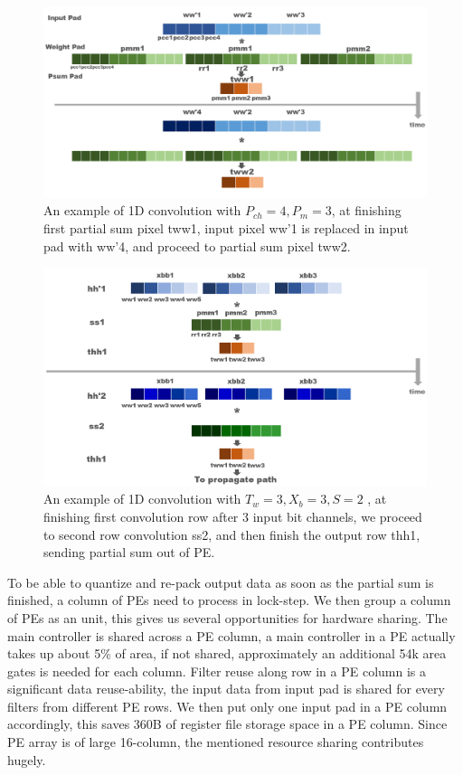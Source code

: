 \begin{figure}
    \centering
    \includegraphics[width=1\linewidth]{inc/4_proposed_architecture/figure/tww.png}
    \caption{An example of 1D convolution with $P_{ch}=4,P_m=3$, at finishing first partial sum pixel tww1, input pixel ww'1 is replaced in input pad with ww'4, and proceed to partial sum pixel tww2. }
    \label{fig:tww}
\end{figure}
\begin{figure}
    \centering
    \includegraphics[width=1\linewidth]{inc/4_proposed_architecture/figure/xb_to_s.png}
    \caption{An example of 1D convolution with $T_w=3,X_b=3,S=2$ , at finishing first convolution row after 3 input bit channels, we proceed to second row convolution ss2, and then finish the output row thh1, sending partial sum out of PE.}
    \label{fig:xb_to_s}
\end{figure}
To be able to quantize and re-pack output data as soon as the partial sum is finished, a column of PEs need to process in lock-step. We then group a column of PEs as an unit, this gives us several opportunities for hardware sharing. The main controller is shared across a PE column, a main controller in a PE actually takes up about 5\% of area, if not shared, approximately an additional 54k area gates is needed for each column. Filter reuse along row in a PE column is a significant data reuse-ability, the input data from input pad is shared for every filters from different PE rows. We then put only one input pad in a PE column accordingly, this saves 360B of register file storage space in a PE column. Since PE array is of large 16-column, the mentioned resource sharing contributes hugely. 

